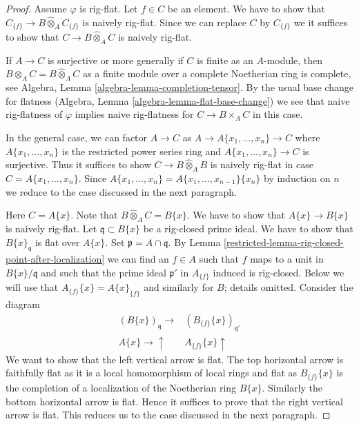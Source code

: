 \begin{proof}

Assume $\varphi$ is rig-flat. Let $f \in C$ be an element.
We have to show that
$C_{\{f\}} \to B \widehat{\otimes}_A C_{\{f\}}$
is naively rig-flat. Since we can replace $C$ by $C_{\{f\}}$
we it suffices to show that $C \to B \widehat{\otimes}_A C$
is naively rig-flat.

\medskip\noindent
If $A \to C$ is surjective or more generally if $C$ is finite as
an $A$-module, then $B \otimes_A C = B \widehat{\otimes}_A C$
as a finite module over a complete Noetherian ring is complete, see
Algebra, Lemma \ref{algebra-lemma-completion-tensor}.
By the usual base change for flatness
(Algebra, Lemma \ref{algebra-lemma-flat-base-change})
we see that naive rig-flatness of $\varphi$ implies naive rig-flatness
for $C \to B \times_A C$ in this case.

\medskip\noindent
In the general case, we can factor $A \to C$ as
$A \to A\{x_1, \ldots, x_n\} \to C$
where $A\{x_1, \ldots, x_n\}$ is the restricted power series ring
and $A\{x_1, \ldots, x_n\} \to C$ is surjective. Thus it
suffices to show $C \to B \widehat{\otimes}_A B$ is naively
rig-flat in case $C = A\{x_1, \ldots, x_n\}$.
Since $A\{x_1, \ldots, x_n\} = A\{x_1, \ldots, x_{n - 1}\}\{x_n\}$
by induction on $n$ we reduce to the case discussed in the next
paragraph.

\medskip\noindent
Here $C = A\{x\}$. Note that $B \widehat{\otimes}_A C = B\{x\}$.
We have to show that $A\{x\} \to B\{x\}$ is naively rig-flat.
Let $\mathfrak q \subset B\{x\}$ be a rig-closed prime ideal.
We have to show that $B\{x\}_{\mathfrak q}$ is flat over $A\{x\}$.
Set $\mathfrak p = A \cap \mathfrak q$.
By Lemma \ref{restricted-lemma-rig-closed-point-after-localization}
we can find an $f \in A$ such that
$f$ maps to a unit in $B\{x\}/\mathfrak q$ and such
that the prime ideal $\mathfrak p'$ in $A_{\{f\}}$ induced is rig-closed.
Below we will use that $A_{\{f\}}\{x\} = A\{x\}_{\{f\}}$ and similarly
for $B$; details omitted. Consider the diagram
$$
\begin{array}{cc}(B\{x\})_{\mathfrak q} \longrightarrow & (B_{\{f\}}\{x\})_{\mathfrak q'} \\ A\{x\} \longrightarrow\uparrow & A_{\{f\}}\{x\} \uparrow\end{array}
$$
We want to show that the left vertical arrow is flat.
The top horizontal arrow is faithfully flat as it is a local
homomorphism of local rings and flat as $B_{\{f\}}\{x\}$
is the completion of a localization of the Noetherian ring
$B\{x\}$. Similarly the bottom horizontal arrow is flat.
Hence it suffices to prove that the right vertical arrow is flat.
This reduces us to the case discussed in the next paragraph.


\end{proof}

